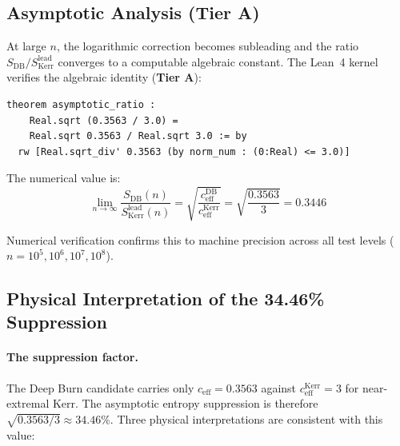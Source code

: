 \documentclass[11pt,a4paper]{article}
\theoremstyle{plain}
\theoremstyle{definition}
\theoremstyle{remark}
\newcommand{\tierA}{\textbf{Tier A}}
\begin{document}
\subsection{Asymptotic Analysis (\tierA{})}

At large $n$, the logarithmic correction becomes subleading and the ratio
$S_{\mathrm{DB}} / S_{\mathrm{Kerr}}^{\mathrm{lead}}$ converges to a
computable algebraic constant. The Lean~4 kernel verifies the algebraic
identity (\tierA{}):

\begin{lstlisting}[caption={Asymptotic ratio verification (VERIFIED).}]
theorem asymptotic_ratio :
    Real.sqrt (0.3563 / 3.0) =
    Real.sqrt 0.3563 / Real.sqrt 3.0 := by
  rw [Real.sqrt_div' 0.3563 (by norm_num : (0:Real) <= 3.0)]
\end{lstlisting}

\noindent The numerical value is:
\[
  \lim_{n\to\infty} \frac{S_{\mathrm{DB}}(n)}{S_{\mathrm{Kerr}}^{\mathrm{lead}}(n)}
  = \sqrt{\frac{c_{\mathrm{eff}}^{\mathrm{DB}}}{c_{\mathrm{eff}}^{\mathrm{Kerr}}}}
  = \sqrt{\frac{0.3563}{3}} = 0.3446
\]

Numerical verification confirms this to machine precision across all test
levels ($n = 10^5, 10^6, 10^7, 10^8$).

\subsection{Physical Interpretation of the 34.46\% Suppression}

\paragraph{The suppression factor.}
The Deep Burn candidate carries only $c_{\mathrm{eff}} = 0.3563$ against
$c_{\mathrm{eff}}^{\mathrm{Kerr}} = 3$ for near-extremal Kerr. The
asymptotic entropy suppression is therefore
$\sqrt{0.3563/3} \approx 34.46\%$. Three physical interpretations are
consistent with this value:
\end{document}
